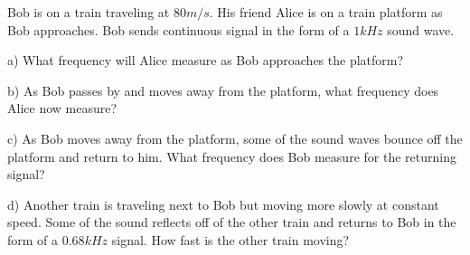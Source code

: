 \documentclass[10pt]{article}
\newenvironment{problem}[2][Problem]{\begin{trivlist}
\item[\hskip \labelsep {\bfseries #1}\hskip \labelsep {\bfseries #2.}]}{\end{trivlist}}
\begin{document}
\begin{problem}{5}
Bob is on a train traveling at $80m/s$. His friend Alice is on a train platform as Bob approaches. Bob sends continuous signal in the form of a $1kHz$ sound wave.
\item a) What frequency will Alice measure as Bob approaches the platform?
\item b) As Bob passes by and moves away from the platform, what frequency does Alice now measure?
\item c) As Bob moves away from the platform, some of the sound waves bounce off the platform and return to him. What frequency does Bob measure for the returning signal?
\item d) Another train is traveling next to Bob but moving more slowly at constant speed. Some of the sound reflects off of the other train and returns to Bob in the form of a $0.68kHz$ signal. How fast is the other train moving?
\end{problem}



\end{document}

